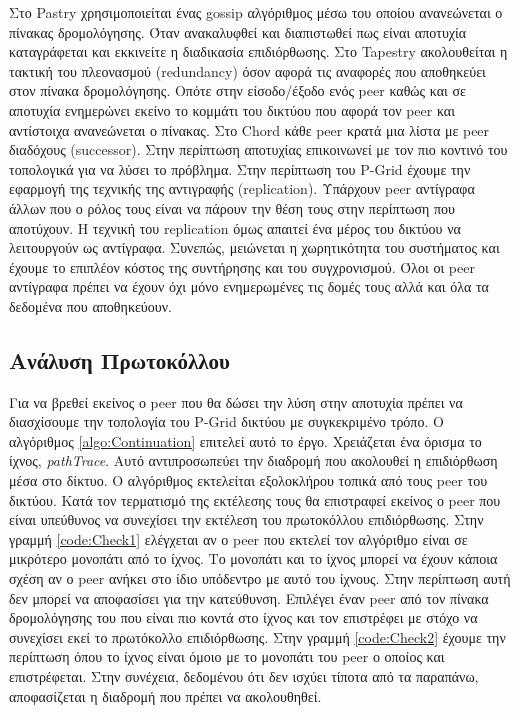 Στο Pastry \citep{Pastry} χρησιμοποιείται ένας gossip αλγόριθμος μέσω 
του οποίου ανανεώνεται ο πίνακας δρομολόγησης. Όταν ανακαλυφθεί και 
διαπιστωθεί πως είναι αποτυχία καταγράφεται και εκκινείτε η διαδικασία 
επιδιόρθωσης. Στο Tapestry \citep{Tapestry} ακολουθείται η τακτική του 
πλεονασμού (redundancy) όσον αφορά τις αναφορές που αποθηκεύει στον 
πίνακα δρομολόγησης. Οπότε στην είσοδο/έξοδο ενός peer καθώς και σε 
αποτυχία ενημερώνει εκείνο το κομμάτι του δικτύου που αφορά τον peer και 
αντίστοιχα ανανεώνεται ο πίνακας. Στο Chord \citep{Chord} κάθε peer 
κρατά μια λίστα με peer διαδόχους (successor). Στην περίπτωση αποτυχίας 
επικοινωνεί με τον πιο κοντινό του τοπολογικά για να λύσει το πρόβλημα. 
Στην περίπτωση του P-Grid έχουμε την εφαρμογή της τεχνικής της 
αντιγραφής (replication). Υπάρχουν peer αντίγραφα άλλων που ο ρόλος τους 
είναι να πάρουν την θέση τους στην περίπτωση που αποτύχουν. 
Η τεχνική του replication όμως απαιτεί ένα μέρος του δικτύου να λειτουργούν 
ως αντίγραφα. Συνεπώς, μειώνεται η χωρητικότητα του συστήματος και έχουμε 
το επιπλέον κόστος της συντήρησης και του συγχρονισμού. Όλοι οι peer 
αντίγραφα πρέπει να έχουν όχι μόνο ενημερωμένες τις δομές τους αλλά και 
όλα τα δεδομένα που αποθηκεύουν.


\subsection{Ανάλυση Πρωτοκόλλου}

Για να βρεθεί εκείνος ο peer που θα δώσει την λύση στην αποτυχία πρέπει 
να διασχίσουμε την τοπολογία του P-Grid δικτύου με συγκεκριμένο τρόπο. Ο 
αλγόριθμος \ref{algo:Continuation} επιτελεί αυτό το έργο. Χρειάζεται ένα 
όρισμα το ίχνος, \textit{pathTrace}. Αυτό αντιπροσωπεύει την διαδρομή που 
ακολουθεί η επιδιόρθωση μέσα στο δίκτυο. Ο αλγόριθμος εκτελείται εξολοκλήρου 
τοπικά από τους peer του δικτύου. Κατά τον τερματισμό της εκτέλεσης τους 
θα επιστραφεί εκείνος ο peer που είναι υπεύθυνος να συνεχίσει την εκτέλεση 
του πρωτοκόλλου επιδιόρθωσης. 
Στην γραμμή \ref{code:Check1} ελέγχεται αν ο peer που εκτελεί τον αλγόριθμο 
είναι σε μικρότερο μονοπάτι από το ίχνος. Το μονοπάτι και το ίχνος μπορεί να 
έχουν κάποια σχέση αν ο peer ανήκει στο ίδιο υπόδεντρο με αυτό του ίχνους. 
Στην περίπτωση αυτή δεν μπορεί να αποφασίσει για την κατεύθυνση. Επιλέγει 
έναν peer από τον πίνακα δρομολόγησης του που είναι πιο κοντά στο ίχνος και 
τον επιστρέφει με στόχο να συνεχίσει εκεί το πρωτόκολλο επιδιόρθωσης.
Στην γραμμή \ref{code:Check2} έχουμε την περίπτωση όπου το ίχνος είναι 
όμοιο με το μονοπάτι του peer ο οποίος και επιστρέφεται. 
Στην συνέχεια, δεδομένου ότι δεν ισχύει τίποτα από τα παραπάνω, αποφασίζεται 
η διαδρομή που πρέπει να ακολουθηθεί.

